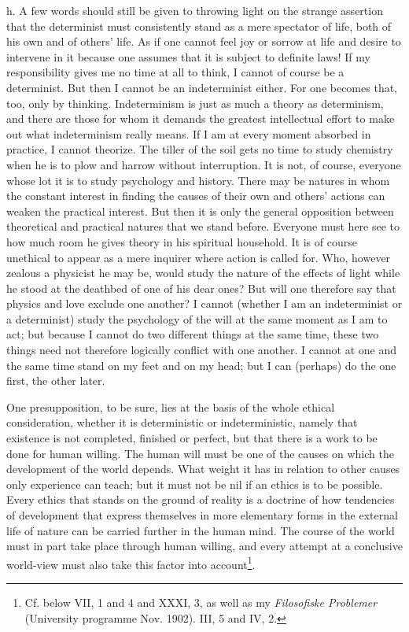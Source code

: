 \documentclass[12pt,a4paper,openany]{book}
\newcommand{\opage}[1]{\marginnote{\footnotesize\textit{[#1]}}}
\begin{document}
h. A few words should still be given to throwing light on the strange assertion that the determinist must
consistently stand as a mere spectator of life, both of his own and of others' life. As if one cannot feel
joy or sorrow at life and desire to intervene in it because one assumes that it is subject to definite
laws! If my responsibility gives me no time at all to think, I cannot of course be a determinist. But then
I cannot be an indeterminist either. For one becomes that, too, only by thinking. Indeterminism is just as
much a theory as determinism, and there are those for whom it demands the greatest intellectual effort to
make out what indeterminism really means. If I am at every moment absorbed in practice, I cannot
theorize. The tiller of the soil gets no time to study chemistry when he is to plow and harrow without
interruption. It is not, of course, everyone whose lot it is to study psychology and history. There may be
natures in whom the constant interest in finding the causes of their own and others' actions can weaken
the practical interest. But then it is only the general opposition between theoretical and practical
natures that we stand before. Everyone must here see to how much room he gives theory in his spiritual
household. It is of course unethical to appear as a mere inquirer where action is called for. Who, however
zealous a physicist he may be, would study the nature of the effects of light while he stood at the
deathbed of one of his dear ones? But will one therefore say that physics and love exclude one another? I
cannot (whether I am an indeterminist or a determinist) study the psychology of the will at the same moment
as I am to act; but because I cannot do two different things at the same time, these two things need not
therefore logically conflict with one another. I cannot at one and the same time stand on my feet and on my
head; but I can (perhaps) do the one first, the other later.

One presupposition, to be sure, lies at the basis of the whole ethical consideration, whether it is
deterministic or indeterministic, namely that existence is not completed,
\opage{125}finished or perfect, but that there is a work to be done for human willing. The human will must be one
of the causes on which the development of the world depends. What weight it has in relation to other causes
only experience can teach; but it must not be nil if an ethics is to be possible. Every ethics that stands on
the ground of reality is a doctrine of how tendencies of development that express themselves in more
elementary forms in the external life of nature can be carried further in the human mind. The course of the
world must in part take place through human willing, and every attempt at a conclusive world-view must also
take this factor into account\footnote[1]{Cf. below VII, 1 and 4 and XXXI, 3, as well as my
\textit{Filosofiske Problemer} (University programme Nov. 1902). III, 5 and IV, 2.}.
\end{document}
